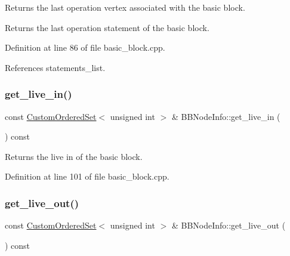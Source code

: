 Returns the last operation vertex associated with the basic block. 

\begin{DoxyReturn}{Returns}
the last operation statement of the basic block. 
\end{DoxyReturn}


Definition at line 86 of file basic\+\_\+block.\+cpp.



References statements\+\_\+list.

\mbox{\label{structBBNodeInfo_ac807a421ffa8d922408050cc1e41a535}} 
\subsubsection{\texorpdfstring{get\+\_\+live\+\_\+in()}{get\_live\_in()}}
{\footnotesize\ttfamily const \hyperlink{classCustomOrderedSet}{Custom\+Ordered\+Set}$<$ unsigned int $>$ \& B\+B\+Node\+Info\+::get\+\_\+live\+\_\+in (\begin{DoxyParamCaption}{ }\end{DoxyParamCaption}) const}



Returns the live in of the basic block. 



Definition at line 101 of file basic\+\_\+block.\+cpp.

\mbox{\label{structBBNodeInfo_ab38bfe567b8a4c7a4d6c278a45cb22d4}} 
\subsubsection{\texorpdfstring{get\+\_\+live\+\_\+out()}{get\_live\_out()}}
{\footnotesize\ttfamily const \hyperlink{classCustomOrderedSet}{Custom\+Ordered\+Set}$<$ unsigned int $>$ \& B\+B\+Node\+Info\+::get\+\_\+live\+\_\+out (\begin{DoxyParamCaption}{ }\end{DoxyParamCaption}) const}



